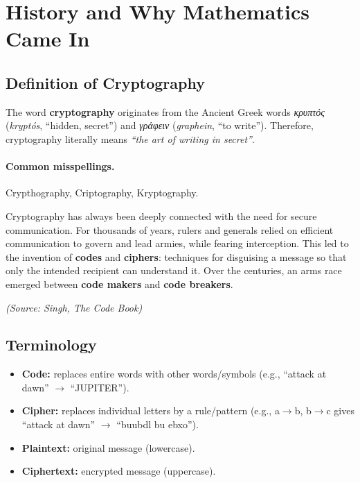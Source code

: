 


\section{History and Why Mathematics Came In}

\subsection{Definition of Cryptography}

The word \textbf{cryptography} originates from the Ancient Greek words \textit{κρυπτός} (\textit{kryptós}, “hidden, secret”) and \textit{γράφειν} (\textit{graphein}, “to write”). Therefore, cryptography literally means \textit{“the art of writing in secret”}.

\paragraph{Common misspellings.}
Crypthography, Criptography, Kryptography.

Cryptography has always been deeply connected with the need for secure communication. For thousands of years, rulers and generals relied on efficient communication to govern and lead armies, while fearing interception. This led to the invention of \textbf{codes} and \textbf{ciphers}: techniques for disguising a message so that only the intended recipient can understand it. Over the centuries, an arms race emerged between \textbf{code makers} and \textbf{code breakers}.

\begin{flushright}
\textit{(Source: Singh, \emph{The Code Book})}
\end{flushright}

\subsection{Terminology}

\begin{itemize}
  \item \textbf{Code:} replaces entire words with other words/symbols (e.g., “attack at dawn” $\rightarrow$ “JUPITER”).
  \item \textbf{Cipher:} replaces individual letters by a rule/pattern (e.g., a$\rightarrow$b, b$\rightarrow$c gives “attack at dawn” $\rightarrow$ “buubdl bu ebxo”).
  \item \textbf{Plaintext:} original message (lowercase).
  \item \textbf{Ciphertext:} encrypted message (uppercase).
\end{itemize}

